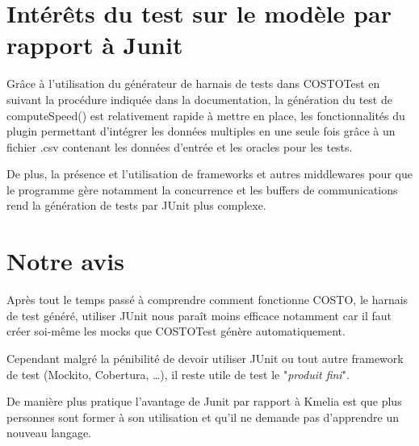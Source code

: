 \section{Intérêts du test sur le modèle par rapport à Junit}

Grâce à l'utilisation du générateur de harnais de tests dans COSTOTest en suivant la procédure indiquée dans la documentation, la génération du test de computeSpeed() est relativement rapide à mettre en place, les fonctionnalités du plugin permettant d'intégrer les données multiples en une seule fois grâce à un fichier .csv contenant les données d'entrée et les oracles pour les tests.

De plus, la présence et l'utilisation de frameworks et autres middlewares pour que le programme gère notamment la concurrence et les buffers de communications rend la génération de tests par JUnit plus complexe.

\section{Notre avis}

Après tout le temps passé à comprendre comment fonctionne COSTO, le harnais de test généré, utiliser JUnit nous paraît moins efficace notamment car il faut créer soi-même les mocks que COSTOTest génère automatiquement. 

Cependant malgré la pénibilité de devoir utiliser JUnit ou tout autre framework de test (Mockito, Cobertura, \dots), il reste utile de test le "\textit{produit fini}". 

De manière plus pratique l'avantage de Junit par rapport à Kmelia est que plus personnes sont former à son utilisation et qu'il ne demande pas d'apprendre un nouveau langage.